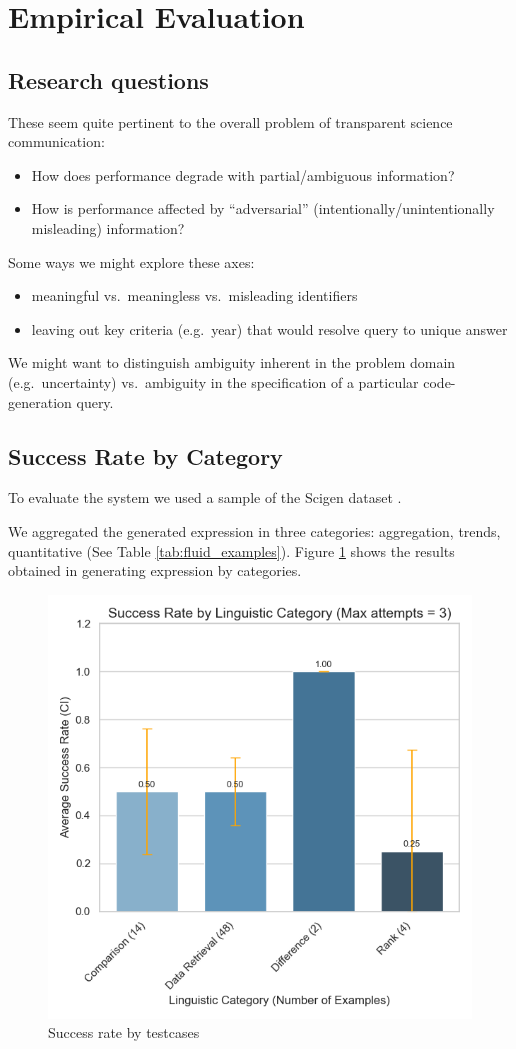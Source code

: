 \section{Empirical Evaluation}
\label{sec:evaluation}

\subsection{Research questions}

These seem quite pertinent to the overall problem of transparent science communication:
\begin{itemize}
\item How does performance degrade with partial/ambiguous information?
\item How is performance affected by ``adversarial'' (intentionally/unintentionally misleading) information?
\end{itemize}

Some ways we might explore these axes:
\begin{itemize}
\item meaningful vs.~meaningless vs.~misleading identifiers
\item leaving out key criteria (e.g.~year) that would resolve query to unique answer
\end{itemize}

We might want to distinguish ambiguity inherent in the problem domain (e.g.~uncertainty) vs.~ambiguity in the
specification of a particular code-generation query.

\subsection{Success Rate by Category}
To evaluate the system we used a sample of the Scigen dataset \cite{scigen_dataset_2021}.

We aggregated the generated expression in three categories: aggregation, trends, quantitative (See Table \ref{tab:fluid_examples}).
Figure \ref{fig:success_rate_by_category} shows the results obtained in generating expression by categories.

\begin{figure}[!h]
    \centering
    \includegraphics[width=0.55\linewidth]{fig/success_rate_by_category}
    \caption{Success rate by testcases}\label{fig:success_rate_by_category}
\end{figure}


